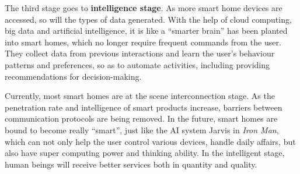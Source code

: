 \documentclass[a4paper,12pt]{book}
\begin{document}
The third stage goes to \textbf{intelligence stage}. As more smart home devices are accessed, so will the types of data generated. With the help of cloud computing, big data and artificial intelligence, it is like a “smarter brain” has been planted into smart homes, which no longer require frequent commands from the user. They collect data from previous interactions and learn the user's behaviour patterns and preferences, so as to automate activities, including providing recommendations for decision-making.

Currently, most smart homes are at the scene interconnection stage. As the penetration rate and intelligence of smart products increase, barriers between communication protocols are being removed. In the future, smart homes are bound to become really “smart”, just like the AI system Jarvis in \textit{Iron Man}, which can not only help the user control various devices, handle daily affairs, but also have super computing power and thinking ability. In the intelligent stage, human beings will receive better services both in quantity and quality.
\end{document}
